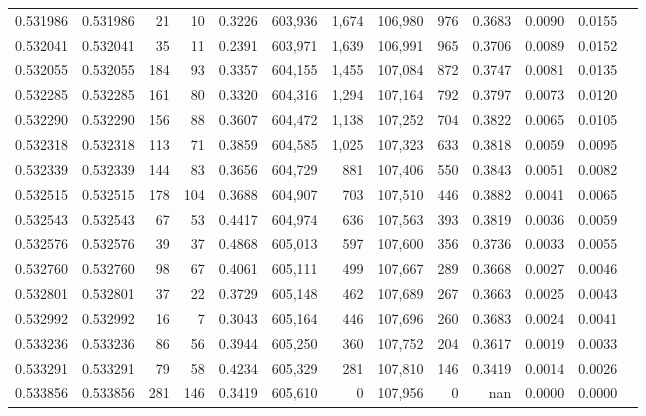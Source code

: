 \begin{tabular}{rrrrrrrrrrrrr}
0.531986 & 0.531986 &    21 &    10 &                                     0.3226 & 603,936 &   1,674 & 106,980 &     976 & 0.3683 & 0.0090 & 0.0155 \\
0.532041 & 0.532041 &    35 &    11 &                                     0.2391 & 603,971 &   1,639 & 106,991 &     965 & 0.3706 & 0.0089 & 0.0152 \\
0.532055 & 0.532055 &   184 &    93 &                                     0.3357 & 604,155 &   1,455 & 107,084 &     872 & 0.3747 & 0.0081 & 0.0135 \\
0.532285 & 0.532285 &   161 &    80 &                                     0.3320 & 604,316 &   1,294 & 107,164 &     792 & 0.3797 & 0.0073 & 0.0120 \\
0.532290 & 0.532290 &   156 &    88 &                                     0.3607 & 604,472 &   1,138 & 107,252 &     704 & 0.3822 & 0.0065 & 0.0105 \\
0.532318 & 0.532318 &   113 &    71 &                                     0.3859 & 604,585 &   1,025 & 107,323 &     633 & 0.3818 & 0.0059 & 0.0095 \\
0.532339 & 0.532339 &   144 &    83 &                                     0.3656 & 604,729 &     881 & 107,406 &     550 & 0.3843 & 0.0051 & 0.0082 \\
0.532515 & 0.532515 &   178 &   104 &                                     0.3688 & 604,907 &     703 & 107,510 &     446 & 0.3882 & 0.0041 & 0.0065 \\
0.532543 & 0.532543 &    67 &    53 &                                     0.4417 & 604,974 &     636 & 107,563 &     393 & 0.3819 & 0.0036 & 0.0059 \\
0.532576 & 0.532576 &    39 &    37 &                                     0.4868 & 605,013 &     597 & 107,600 &     356 & 0.3736 & 0.0033 & 0.0055 \\
0.532760 & 0.532760 &    98 &    67 &                                     0.4061 & 605,111 &     499 & 107,667 &     289 & 0.3668 & 0.0027 & 0.0046 \\
0.532801 & 0.532801 &    37 &    22 &                                     0.3729 & 605,148 &     462 & 107,689 &     267 & 0.3663 & 0.0025 & 0.0043 \\
0.532992 & 0.532992 &    16 &     7 &                                     0.3043 & 605,164 &     446 & 107,696 &     260 & 0.3683 & 0.0024 & 0.0041 \\
0.533236 & 0.533236 &    86 &    56 &                                     0.3944 & 605,250 &     360 & 107,752 &     204 & 0.3617 & 0.0019 & 0.0033 \\
0.533291 & 0.533291 &    79 &    58 &                                     0.4234 & 605,329 &     281 & 107,810 &     146 & 0.3419 & 0.0014 & 0.0026 \\
0.533856 & 0.533856 &   281 &   146 &                                     0.3419 & 605,610 &       0 & 107,956 &       0 &    nan & 0.0000 & 0.0000 \\
\bottomrule
\end{tabular}
